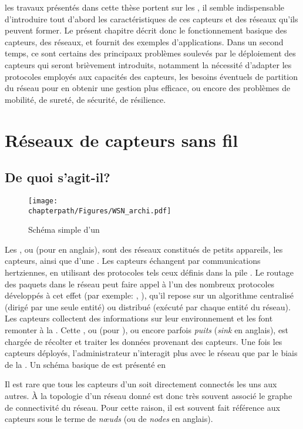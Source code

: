  les travaux présentés dans cette thèse portent sur les \rcsfs, il semble indispensable d'introduire tout d'abord les caractéristiques de ces capteurs et des réseaux qu'ils peuvent former.
Le présent chapitre décrit donc le fonctionnement basique des capteurs, des réseaux, et fournit des exemples d'applications.
Dans un second temps, ce sont certains des principaux problèmes soulevés par le déploiement des capteurs qui seront brièvement introduits, notamment la nécessité d'adapter les protocoles employés aux capacités des capteurs, les besoins éventuels de partition du réseau pour en obtenir une gestion plus efficace, ou encore des problèmes de mobilité, de sureté, de sécurité, de résilience.

\section{Réseaux de capteurs sans fil}

    \subsection{De quoi s'agit-il?}
\begin{figure}[!ht]
    \centering
    \texttt{[image: \\chapterpath/Figures/WSN\_archi.pdf]}
    \caption{Schéma simple d'un \rcsf}\label{st:fig:wsnintro}
\end{figure}
Les \rcsfs, ou \textit{\WSN} (pour \wsns en anglais), sont des réseaux constitués de petits appareils, les capteurs, ainsi que d'une \sdb.
Les capteurs échangent par communications hertziennes, en utilisant des protocoles tels ceux définis dans la pile \ieeee.
Le routage des paquets dans le réseau peut faire appel à l'un des nombreux protocoles développés à cet effet (par exemple: \aodv, \olsr), qu'il repose sur un algorithme centralisé (dirigé par une seule entité) ou distribué (exécuté par chaque entité du réseau).
Les capteurs collectent des informations sur leur environnement et les font remonter à la \sdb.
Cette \sdb, ou \BS (pour \bs), ou encore parfois \textit{puits} (\textit{sink} en anglais), est chargée de récolter et traiter les données provenant des capteurs.
Une fois les capteurs déployés, l'administrateur n'interagit plus avec le réseau que par le biais de la \sdb.
Un schéma basique de \rcsf est présenté en 

Il est rare que tous les capteurs d'un \WSN soit directement connectés les uns aux autres.
À la topologie d'un réseau donné est donc très souvent associé le graphe de connectivité du réseau.
Pour cette raison, il est souvent fait référence aux capteurs sous le terme de \textit{nœuds} (ou de \textit{nodes} en anglais).

